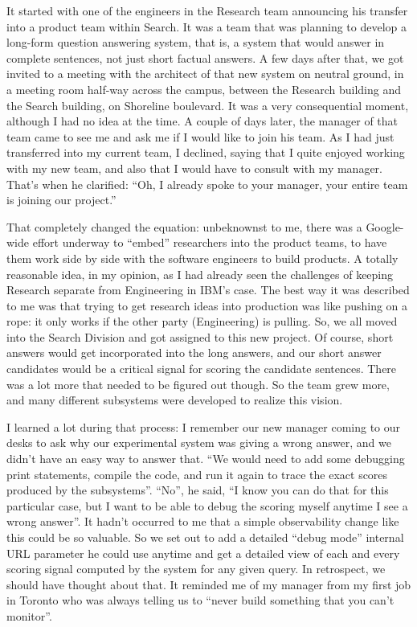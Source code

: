 \documentclass[12pt]{book}
\begin{document}
It started with one of the engineers in the Research team announcing his
transfer into a product team within Search. It was a team that was
planning to develop a long-form question answering system, that is, a
system that would answer in complete sentences, not just short factual
answers. A few days after that, we got invited to a meeting with the
architect of that new system on neutral ground, in a meeting room
half-way across the campus, between the Research building and the Search
building, on Shoreline boulevard. It was a very consequential moment,
although I had no idea at the time. A couple of days later, the manager
of that team came to see me and ask me if I would like to join his team.
As I had just transferred into my current team, I declined, saying that
I quite enjoyed working with my new team, and also that I would have to
consult with my manager. That's when he clarified: ``Oh, I already spoke
to your manager, your entire team is joining our project.''

That completely changed the equation: unbeknownst to me, there was a
Google-wide effort underway to ``embed'' researchers into the product
teams, to have them work side by side with the software engineers to
build products. A totally reasonable idea, in my opinion, as I had
already seen the challenges of keeping Research separate from
Engineering in IBM's case. The best way it was described to me was that
trying to get research ideas into production was like pushing on a rope:
it only works if the other party (Engineering) is pulling. So, we all
moved into the Search Division and got assigned to this new project. Of
course, short answers would get incorporated into the long answers, and
our short answer candidates would be a critical signal for scoring the
candidate sentences. There was a lot more that needed to be figured out
though. So the team grew more, and many different subsystems were
developed to realize this vision.

I learned a lot during that process: I remember our new manager coming
to our desks to ask why our experimental system was giving a wrong
answer, and we didn't have an easy way to answer that. ``We would need
to add some debugging print statements, compile the code, and run it
again to trace the exact scores produced by the subsystems''. ``No'', he
said, ``I know you can do that for this particular case, but I want to
be able to debug the scoring myself anytime I see a wrong answer''. It
hadn't occurred to me that a simple observability change like this could
be so valuable. So we set out to add a detailed ``debug mode'' internal
URL parameter he could use anytime and get a detailed view of each and
every scoring signal computed by the system for any given query. In
retrospect, we should have thought about that. It reminded me of my
manager from my first job in Toronto who was always telling us to
``never build something that you can't monitor''.
\end{document}
